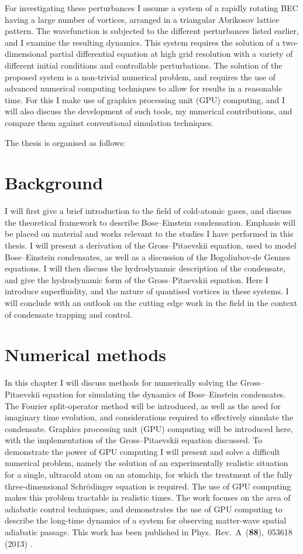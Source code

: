 For investigating these perturbances I assume a system of a rapidly rotating BEC having a large number of vortices, arranged in a triangular Abrikosov lattice pattern. The wavefunction is subjected to the different perturbances listed earlier, and I examine the resulting dynamics. This system requires the solution of a two-dimensional partial differential equation at high grid resolution with a variety of different initial conditions and controllable perturbations. The solution of the proposed system is a non-trivial numerical problem, and requires the use of advanced numerical computing techniques to allow for results in a reasonable time. For this I make use of graphics processing unit (GPU) computing, and I will also discuss the development of such tools, my numerical contributions, and compare them against conventional simulation techniques.

The thesis is organised as follows:

\section*{Background}
I will first give a brief introduction to the field of cold-atomic gases, and discuss the theoretical framework to describe Bose--Einstein condensation. Emphasis will be placed on material and works relevant to the studies I have performed in this thesis. I will present a derivation of the Gross--Pitaevskii equation, used to model Bose--Einstein condensates, as well as a discussion of the Bogoliubov-de Gennes equations. I will then discuss the hydrodynamic description of the condensate, and give the hydrodynamic form of the Gross--Pitaevskii equation. Here I introduce superfluidity, and the nature of quantised vortices in these systems. I will conclude with an outlook on the cutting edge work in the field in the context of condensate trapping and control.


\section*{Numerical methods}
In this chapter I will discuss methods for numerically solving the Gross--Pitaevskii equation for simulating the dynamics of Bose--Einstein condensates. The Fourier split-operator method will be introduced, as well as the need for imaginary time evolution, and considerations required to effectively simulate the condensate. Graphics processing unit (GPU) computing will be introduced here, with the implementation of the Gross--Pitaevskii equation discussed. To demonstrate the power of GPU computing I will present and solve a difficult numerical problem, namely the solution of an experimentally realistic situation for a single, ultracold atom on an atomchip, for which the treatment of the fully three-dimensional Schr\"odinger equation is required. The use of GPU computing makes this problem tractable in realistic times. The work focuses on the area of adiabatic control techniques, and demonstrates the use of GPU computing to describe the long-time dynamics of a system for observing matter-wave spatial adiabatic passage. This work has been published in  Phys.~Rev.~A~(\textbf{88}),~053618 (2013) \cite{AO:Morgan_pra_2013}.

